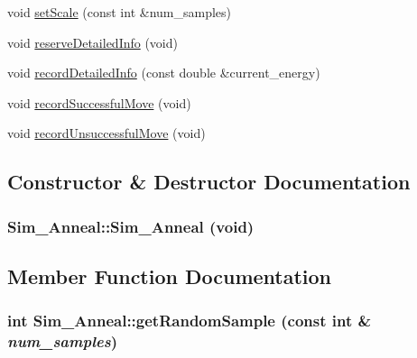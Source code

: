 \begin{CompactItemize}
\item 
void \hyperlink{classSim__Anneal_e099bb1d6024d20d12cac05597e5b02a}{setScale} (const int \&num\_\-samples)
\item 
void \hyperlink{classSim__Anneal_8fefd06ac45d893bbc9b8e01c0d0fdf3}{reserveDetailedInfo} (void)
\item 
void \hyperlink{classSim__Anneal_c0ed4758fe537d303240359100d7e881}{recordDetailedInfo} (const double \&current\_\-energy)
\item 
void \hyperlink{classSim__Anneal_e046126356e4cf9719159c66221cb66a}{recordSuccessfulMove} (void)
\item 
void \hyperlink{classSim__Anneal_8d31a68b6bf7b2fb8461806503cffbab}{recordUnsuccessfulMove} (void)
\end{CompactItemize}


\subsection{Constructor \& Destructor Documentation}
\hypertarget{classSim__Anneal_603424c51607fd3dc2fe99757106f472}{
\subsubsection[Sim\_\-Anneal]{\setlength{\rightskip}{0pt plus 5cm}Sim\_\-Anneal::Sim\_\-Anneal (void)}}
\label{classSim__Anneal_603424c51607fd3dc2fe99757106f472}




\subsection{Member Function Documentation}
\hypertarget{classSim__Anneal_7f4531410e05e85db08a3da83d484c49}{
\subsubsection[getRandomSample]{\setlength{\rightskip}{0pt plus 5cm}int Sim\_\-Anneal::getRandomSample (const int \& {\em num\_\-samples})}}
\label{classSim__Anneal_7f4531410e05e85db08a3da83d484c49}


